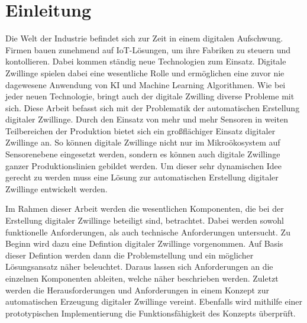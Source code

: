 \documentclass[
	12pt,
	BCOR=5mm,
	DIV=12,
	headinclude=on,
	footinclude=off,
	parskip=half,
	bibliography=totoc,
	listof=entryprefix,
	toc=listof,
	numbers=noenddot,
	plainfootsepline
]{scrreprt}
\begin{document}






\normalfont



\tableofcontents

\listoffigures





\clearpage
\ihead{\chaptername~\thechapter}
\ohead{\headmark}

\chapter{Einleitung}

Die Welt der Industrie befindet sich zur Zeit in einem digitalen Aufschwung. Firmen bauen zunehmend auf IoT-Lösungen, um ihre Fabriken zu steuern und kontollieren. Dabei kommen ständig neue Technologien zum Einsatz. Digitale Zwillinge spielen dabei eine wesentliche Rolle und ermöglichen eine zuvor nie dagewesene Anwendung von KI und Machine Learning Algorithmen. Wie bei jeder neuen Technologie, bringt auch der digitale Zwilling diverse Probleme mit sich. Diese Arbeit befasst sich mit der Problematik der automatischen Erstellung digitaler Zwillinge. Durch den Einsatz von mehr und mehr Sensoren in weiten Teilbereichen der Produktion bietet sich ein großflächiger Einsatz digitaler Zwillinge an. So können digitale Zwillinge nicht nur im Mikroökosystem auf Sensorenebene eingesetzt werden, sondern es können auch digitale Zwillinge ganzer Produktionslinien gebildet werden. Um dieser sehr dynamischen Idee gerecht zu werden muss eine Lösung zur automatischen Erstellung digitaler Zwillinge entwickelt werden. 

Im Rahmen dieser Arbeit werden die wesentlichen Komponenten, die bei der Erstellung digitaler Zwillinge beteiligt sind, betrachtet. Dabei werden sowohl funktionelle Anforderungen, als auch technische Anforderungen untersucht. Zu Beginn wird dazu eine Defintion digitaler Zwillinge vorgenommen. Auf Basis dieser Defintion werden dann die Problemstellung und ein möglicher Lösungsansatz näher beleuchtet. Daraus lassen sich Anforderungen an die einzelnen Komponenten ableiten, welche näher beschrieben werden. Zuletzt werden die Herausforderungen und Anforderungen in einem Konzept zur automatischen Erzeugung digitaler Zwillinge vereint. Ebenfalls wird mithilfe einer prototypischen Implementierung die Funktionsfähigkeit des Konzepts überprüft.
\end{document}
